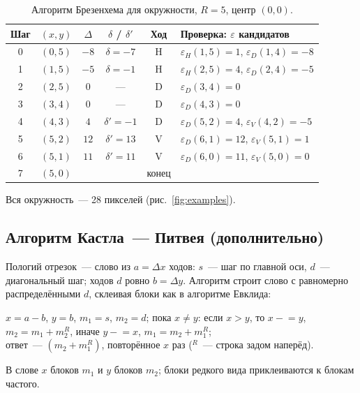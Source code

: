 \documentclass[11pt,a4paper]{article}
\begin{document}
\begin{table}[H]
\centering\small
\caption{Алгоритм Брезенхема для окружности, $R = 5$, центр $(0, 0)$.}
\begin{tabular}{cccccl}
\toprule
Шаг & $(x, y)$ & $\Delta$ & $\delta$ / $\delta'$ & Ход & Проверка: $\varepsilon$ кандидатов \\
\midrule
0 & $(0,5)$ & $-8$ & $\delta = -7$ & H & $\varepsilon_H(1,5) = 1$, $\varepsilon_D(1,4) = -8$ \\
1 & $(1,5)$ & $-5$ & $\delta = -1$ & H & $\varepsilon_H(2,5) = 4$, $\varepsilon_D(2,4) = -5$ \\
2 & $(2,5)$ & $0$ & --- & D & $\varepsilon_D(3,4) = 0$ \\
3 & $(3,4)$ & $0$ & --- & D & $\varepsilon_D(4,3) = 0$ \\
4 & $(4,3)$ & $4$ & $\delta' = -1$ & D & $\varepsilon_D(5,2) = 4$, $\varepsilon_V(4,2) = -5$ \\
5 & $(5,2)$ & $12$ & $\delta' = 13$ & V & $\varepsilon_D(6,1) = 12$, $\varepsilon_V(5,1) = 1$ \\
6 & $(5,1)$ & $11$ & $\delta' = 11$ & V & $\varepsilon_D(6,0) = 11$, $\varepsilon_V(5,0) = 0$ \\
7 & $(5,0)$ & & & конец & \\
\bottomrule
\end{tabular}
\end{table}
Вся окружность~— 28 пикселей (рис.~\ref{fig:examples}).

\subsection{Алгоритм Кастла~— Питвея (дополнительно)}
Пологий отрезок~— слово из $a = \Delta x$ ходов: $s$~— шаг по главной оси, $d$~—
диагональный шаг; ходов $d$ ровно $b = \Delta y$. Алгоритм строит слово с равномерно
распределёнными $d$, склеивая блоки как в алгоритме Евклида:
\begin{center}\small
$x = a - b$, $y = b$, $m_1 = s$, $m_2 = d$;\quad
пока $x \ne y$: если $x > y$, то $x \mathrel{-}= y$, $m_2 = m_1 + m_2^R$, иначе $y \mathrel{-}= x$, $m_1 = m_2 + m_1^R$;\\
ответ~— $(m_2 + m_1^R)$, повторённое $x$ раз ($^R$~— строка задом наперёд).
\end{center}
В слове $x$ блоков $m_1$ и $y$ блоков $m_2$; блоки редкого вида приклеиваются
к блокам частого.
\end{document}
